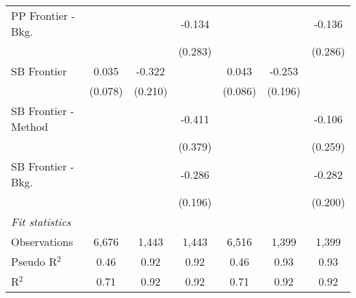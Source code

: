 \begin{tabular}{lcccccc}
   PP Frontier - Bkg.   &               &               & -0.134        &               &               & -0.136\\   
                        &               &               & (0.283)       &               &               & (0.286)\\   
   SB Frontier          & 0.035         & -0.322        &               & 0.043         & -0.253        &   \\   
                        & (0.078)       & (0.210)       &               & (0.086)       & (0.196)       &   \\   
   SB Frontier - Method &               &               & -0.411        &               &               & -0.106\\   
                        &               &               & (0.379)       &               &               & (0.259)\\   
   SB Frontier - Bkg.   &               &               & -0.286        &               &               & -0.282\\   
                        &               &               & (0.196)       &               &               & (0.200)\\   
   \midrule
   \emph{Fit statistics}\\
   Observations         & 6,676         & 1,443         & 1,443         & 6,516         & 1,399         & 1,399\\  
   Pseudo R$^2$         & 0.46          & 0.92          & 0.92          & 0.46          & 0.93          & 0.93\\  
   R$^2$                & 0.71          & 0.92          & 0.92          & 0.71          & 0.92          & 0.92\\  
   

\end{tabular}
